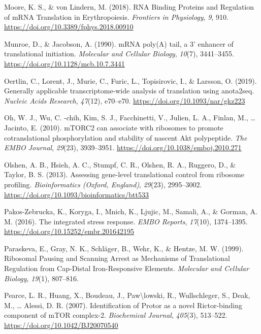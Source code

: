 \documentclass[12pt,openany]{book}
\begin{document}
\hypertarget{ref-Moore2018}{}
Moore, K. S., \& von Lindern, M. (2018). RNA Binding Proteins and
Regulation of mRNA Translation in Erythropoiesis. \emph{Frontiers in
Physiology}, \emph{9}, 910.
\url{https://doi.org/10.3389/fphys.2018.00910}

\hypertarget{ref-Munroe1990}{}
Munroe, D., \& Jacobson, A. (1990). mRNA poly(A) tail, a 3' enhancer of
translational initiation. \emph{Molecular and Cellular Biology},
\emph{10}(7), 3441--3455. \url{https://doi.org/10.1128/mcb.10.7.3441}

\hypertarget{ref-Oertlin2019}{}
Oertlin, C., Lorent, J., Murie, C., Furic, L., Topisirovic, I., \&
Larsson, O. (2019). Generally applicable transcriptome-wide analysis of
translation using anota2seq. \emph{Nucleic Acids Research},
\emph{47}(12), e70--e70. \url{https://doi.org/10.1093/nar/gkz223}

\hypertarget{ref-Oh2010}{}
Oh, W. J., Wu, C. -chih, Kim, S. J., Facchinetti, V., Julien, L. A.,
Finlan, M., \ldots{} Jacinto, E. (2010). mTORC2 can associate with
ribosomes to promote cotranslational phosphorylation and stability of
nascent Akt polypeptide. \emph{The EMBO Journal}, \emph{29}(23),
3939--3951. \url{https://doi.org/10.1038/emboj.2010.271}

\hypertarget{ref-Olshen2013}{}
Olshen, A. B., Hsieh, A. C., Stumpf, C. R., Olshen, R. A., Ruggero, D.,
\& Taylor, B. S. (2013). Assessing gene-level translational control from
ribosome profiling. \emph{Bioinformatics (Oxford, England)},
\emph{29}(23), 2995--3002.
\url{https://doi.org/10.1093/bioinformatics/btt533}

\hypertarget{ref-Pakos-Zebrucka2016}{}
Pakos-Zebrucka, K., Koryga, I., Mnich, K., Ljujic, M., Samali, A., \&
Gorman, A. M. (2016). The integrated stress response. \emph{EMBO
Reports}, \emph{17}(10), 1374--1395.
\url{https://doi.org/10.15252/embr.201642195}

\hypertarget{ref-Paraskeva1999}{}
Paraskeva, E., Gray, N. K., Schläger, B., Wehr, K., \& Hentze, M. W.
(1999). Ribosomal Pausing and Scanning Arrest as Mechanisms of
Translational Regulation from Cap-Distal Iron-Responsive Elements.
\emph{Molecular and Cellular Biology}, \emph{19}(1), 807--816.

\hypertarget{ref-Pearce2007}{}
Pearce, L. R., Huang, X., Boudeau, J., Paw\textbackslash{}lowski, R.,
Wullschleger, S., Deak, M., \ldots{} Alessi, D. R. (2007).
Identification of Protor as a novel Rictor-binding component of mTOR
complex-2. \emph{Biochemical Journal}, \emph{405}(3), 513--522.
\url{https://doi.org/10.1042/BJ20070540}
\end{document}
